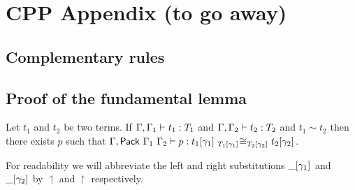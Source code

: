 \setchapterpreamble[u]{\margintoc}
\chapter{CPP Appendix (to go away)}

\section{Complementary rules}
\label{sec:more-rules}




\section{Proof of the fundamental lemma}
\label{sec:proof-fund-lemma}

\begin{lemma}
  Let $t_1$ and $t_2$ be two terms. If $\isterm{\Ga, \Ga_1}{t_1}{T_1}$ and
  $\isterm{\Ga, \Ga_2}{t_2}{T_2}$ and $t_1 \sim t_2$ then there exists $p$ such
  that
  $\isterm{\Ga, \Pack{\Ga_1}{\Ga_2}}
          {p}
          {\Heq{\llift{\gamma}{}{T_1}}
               {\llift{\gamma}{}{t_1}}
               {\rlift{\gamma}{}{T_2}}
               {\rlift{\gamma}{}{t_2}}}$.
\end{lemma}

For readability we will abbreviate the left and right substitutions
$\llift{\gamma}{}{\_}$ and $\rlift{\gamma}{}{\_}$ by $\upharpoonleft$
and $\upharpoonright$ respectively.

